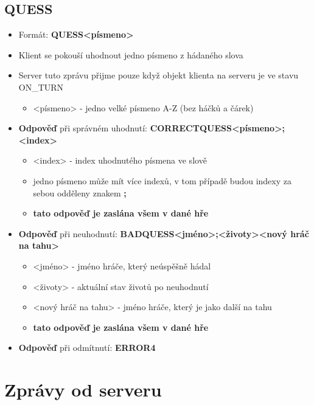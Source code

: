 \documentclass[12pt]{report}
\begin{document}
	\subsection{QUESS}
		\begin{itemize}
			\item Formát: \textbf{QUESS{\textbar}{\textless}písmeno{\textgreater}}
			\item Klient se pokouší uhodnout jedno písmeno z hádaného slova
			\item Server tuto zprávu přijme pouze když objekt klienta na serveru je ve stavu ON\_TURN
			\begin{itemize}
				\item {\textless}písmeno{\textgreater} - jedno velké písmeno A-Z (bez háčků a čárek)
			\end{itemize}
			\item \textbf{Odpověď} při správném uhodnutí: \textbf{CORRECTQUESS{\textbar}{\textless}písmeno{\textgreater};{\textless}index{\textgreater}}
			\begin{itemize}
				\item {\textless}index{\textgreater} - index uhodnutého písmena ve slově
				\item jedno písmeno může mít více indexů, v tom případě budou indexy za sebou odděleny znakem \textbf{;}
				\item \textbf{tato odpověď je zaslána všem v dané hře}
			\end{itemize}
			\item \textbf{Odpověď} při neuhodnutí: \textbf{BADQUESS{\textbar}{\textless}jméno{\textgreater};{\textless}životy{\textgreater}{\textbar}{\textless}nový hráč na tahu{\textgreater}}
			\begin{itemize}
				\item {\textless}jméno{\textgreater} - jméno hráče, který neúspěšně hádal
				\item {\textless}životy{\textgreater} - aktuální stav životů po neuhodnutí
				\item {\textless}nový hráč na tahu{\textgreater} - jméno hráče, který je jako další na tahu
				\item \textbf{tato odpověď je zaslána všem v dané hře}
			\end{itemize}
			\item \textbf{Odpověď} při odmítnutí: \textbf{ERROR{\textbar}4}
		\end{itemize}
	
	\section{Zprávy od serveru}
	
\end{document}
